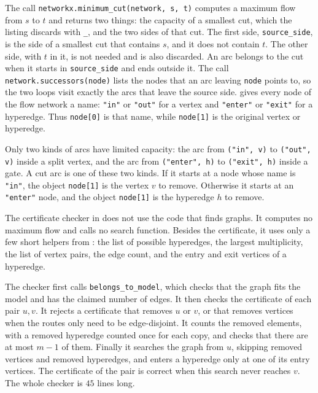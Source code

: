 
The call \texttt{networkx.minimum\_cut(network, s, t)} computes a maximum flow from $s$ to $t$ and returns two things: the capacity of a smallest cut, which the listing discards with \texttt{\_}, and the two sides of that cut.
The first side, \texttt{source\_side}, is the side of a smallest cut that contains $s$, and it does not contain $t$.
The other side, with $t$ in it, is not needed and is also discarded.
An arc belongs to the cut when it starts in \texttt{source\_side} and ends outside it.
The call \texttt{network.successors(node)} lists the nodes that an arc leaving \texttt{node} points to, so the two loops visit exactly the arcs that leave the source side.
 gives every node of the flow network a name: \texttt{"in"} or \texttt{"out"} for a vertex and \texttt{"enter"} or \texttt{"exit"} for a hyperedge.
Thus \texttt{node[0]} is that name, while \texttt{node[1]} is the original vertex or hyperedge.

Only two kinds of arcs have limited capacity: the arc from \texttt{("in", v)} to \texttt{("out", v)} inside a split vertex, and the arc from \texttt{("enter", h)} to \texttt{("exit", h)} inside a gate.
A cut arc is one of these two kinds.
If it starts at a node whose name is \texttt{"in"}, the object \texttt{node[1]} is the vertex $v$ to remove.
Otherwise it starts at an \texttt{"enter"} node, and the object \texttt{node[1]} is the hyperedge $h$ to remove.

The certificate checker in  does not use the code that finds graphs.
It computes no maximum flow and calls no search function.
Besides the certificate, it uses only a few short helpers from : the list of possible hyperedges, the largest multiplicity, the list of vertex pairs, the edge count, and the entry and exit vertices of a hyperedge.

The checker first calls \texttt{belongs\_to\_model}, which checks that the graph fits the model and has the claimed number of edges.
It then checks the certificate of each pair $u,v$.
It rejects a certificate that removes $u$ or $v$, or that removes vertices when the routes only need to be edge-disjoint.
It counts the removed elements, with a removed hyperedge counted once for each copy, and checks that there are at most $m-1$ of them.
Finally it searches the graph from $u$, skipping removed vertices and removed hyperedges, and enters a hyperedge only at one of its entry vertices.
The certificate of the pair is correct when this search never reaches $v$.
The whole checker is $45$ lines long.

